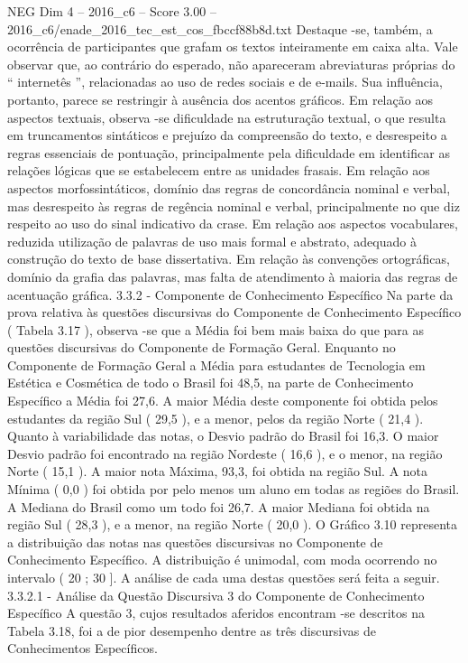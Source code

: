 \begin{textsample}{NEG Dim 4 – 2016\_c6 – Score 3.00 – 2016\_c6/enade\_2016\_tec\_est\_cos\_fbccf88b8d.txt}
Destaque -se, também, a ocorrência de participantes que grafam os textos inteiramente em caixa alta.
Vale observar que, ao contrário do esperado, não apareceram abreviaturas próprias do “ internetês ”, relacionadas ao uso de redes sociais e de e-mails.
Sua influência, portanto, parece se restringir à ausência dos acentos gráficos.
Em relação aos aspectos textuais, observa -se dificuldade na estruturação textual, o que resulta em truncamentos sintáticos e prejuízo da compreensão do texto, e desrespeito a regras essenciais de pontuação, principalmente pela dificuldade em identificar as relações lógicas que se estabelecem entre as unidades frasais.
Em relação aos aspectos morfossintáticos, domínio das regras de concordância nominal e verbal, mas desrespeito às regras de regência nominal e verbal, principalmente no que diz respeito ao uso do sinal indicativo da crase.
Em relação aos aspectos vocabulares, reduzida utilização de palavras de uso mais formal e abstrato, adequado à construção do texto de base dissertativa.
Em relação às convenções ortográficas, domínio da grafia das palavras, mas falta de atendimento à maioria das regras de acentuação gráfica. 3.3.2 - Componente de Conhecimento Específico Na parte da prova relativa às questões discursivas do Componente de Conhecimento Específico ( Tabela 3.17 ), observa -se que a Média foi bem mais baixa do que para as questões discursivas do Componente de Formação Geral.
Enquanto no Componente de Formação Geral a Média para estudantes de Tecnologia em Estética e Cosmética de todo o Brasil foi 48,5, na parte de Conhecimento Específico a Média foi 27,6.
A maior Média deste componente foi obtida pelos estudantes da região Sul ( 29,5 ), e a menor, pelos da região Norte ( 21,4 ).
Quanto à variabilidade das notas, o Desvio padrão do Brasil foi 16,3.
O maior Desvio padrão foi encontrado na região Nordeste ( 16,6 ), e o menor, na região Norte ( 15,1 ).
A maior nota Máxima, 93,3, foi obtida na região Sul.
A nota Mínima ( 0,0 ) foi obtida por pelo menos um aluno em todas as regiões do Brasil.
A Mediana do Brasil como um todo foi 26,7.
A maior Mediana foi obtida na região Sul ( 28,3 ), e a menor, na região Norte ( 20,0 ).
O Gráfico 3.10 representa a distribuição das notas nas questões discursivas no Componente de Conhecimento Específico.
A distribuição é unimodal, com moda ocorrendo no intervalo ( 20 ; 30 ].
A análise de cada uma destas questões será feita a seguir. 3.3.2.1 - Análise da Questão Discursiva 3 do Componente de Conhecimento Específico A questão 3, cujos resultados aferidos encontram -se descritos na Tabela 3.18, foi a de pior desempenho dentre as três discursivas de Conhecimentos Específicos.

\end{textsample}
